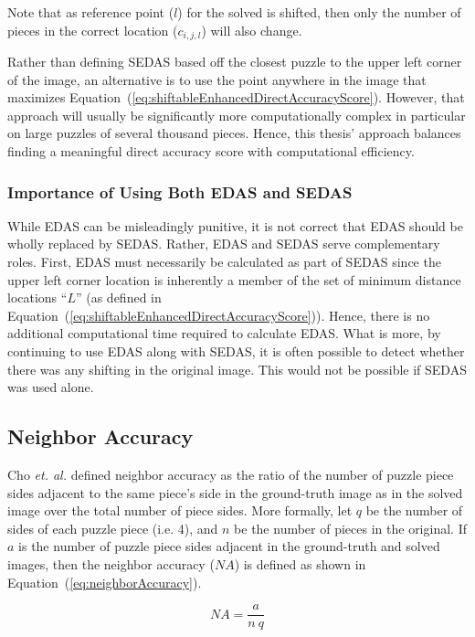 \documentclass{report}
\def\eref#1{(\ref{#1})}
\begin{document}
Note that as reference point ($l$) for the solved is shifted, then only the number of pieces in the correct location ($c_{i,j,l}$) will also change.  

Rather than defining SEDAS based off the closest puzzle to the upper left corner of the image, an alternative is to use the point anywhere in the image that maximizes Equation~\eref{eq:shiftableEnhancedDirectAccuracyScore}.  However, that approach will usually be significantly more computationally complex in particular on large puzzles of several thousand pieces.  Hence, this thesis' approach balances finding a meaningful direct accuracy score with computational efficiency.

\subsubsection{Importance of Using Both EDAS and SEDAS}\label{sec:importanceEdasSedas}

While EDAS can be misleadingly punitive, it is not correct that EDAS should be wholly replaced by SEDAS.  Rather, EDAS and SEDAS serve complementary roles.  First, EDAS must necessarily be calculated as part of SEDAS since the upper left corner location is inherently a member of the set of minimum distance locations ``$L$'' (as defined in Equation~\eref{eq:shiftableEnhancedDirectAccuracyScore}).  Hence, there is no additional computational time required to calculate EDAS.  What is more, by continuing to use EDAS along with SEDAS, it is often possible to detect whether there was any shifting in the original image.  This would not be possible if SEDAS was used alone.

\subsection{Neighbor Accuracy}\label{sec:neighborAccuracy}

Cho \textit{et. al.} \cite{cho2010} defined neighbor accuracy as the ratio of the number of puzzle piece sides adjacent to the same piece's side in the ground-truth image as in the solved image over the total number of piece sides.  More formally, let $q$ be the number of sides of each puzzle piece (i.e. 4), and $n$ be the number of pieces in the original.  If $a$ is the number of puzzle piece sides adjacent in the ground-truth and solved images, then the neighbor accuracy ($NA$) is defined as shown in Equation~\eref{eq:neighborAccuracy}.

\begin{equation} \label{eq:neighborAccuracy}
NA = \frac{a}{n~q}
\end{equation}
\end{document}

